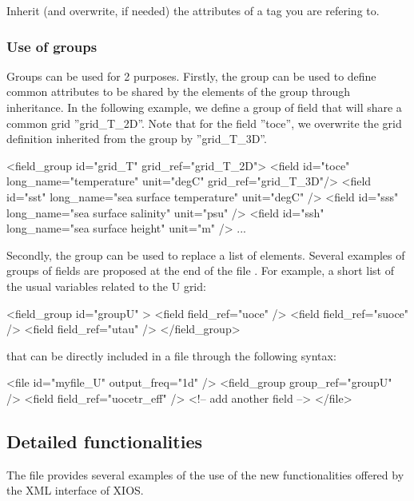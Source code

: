 \documentclass[../main/NEMO_manual]{subfiles}
\begin{document}
Inherit (and overwrite, if needed) the attributes of a tag you are refering to.

\subsubsection{Use of groups}

Groups can be used for 2 purposes.
Firstly, the group can be used to define common attributes to be shared by the elements of
the group through inheritance.
In the following example, we define a group of field that will share a common grid ''grid\_T\_2D''.
Note that for the field ''toce'', we overwrite the grid definition inherited from the group by ''grid\_T\_3D''.

\begin{xmllines}
<field_group id="grid_T" grid_ref="grid_T_2D">
	<field id="toce" long_name="temperature"             unit="degC" grid_ref="grid_T_3D"/>
	<field id="sst"  long_name="sea surface temperature" unit="degC"                     />
	<field id="sss"  long_name="sea surface salinity"    unit="psu"                      />
	<field id="ssh"  long_name="sea surface height"      unit="m"                        />
	...
\end{xmllines}

Secondly, the group can be used to replace a list of elements.
Several examples of groups of fields are proposed at the end of the file .
For example, a short list of the usual variables related to the U grid:

\begin{xmllines}
<field_group id="groupU" >
	<field field_ref="uoce"  />
	<field field_ref="suoce" />
	<field field_ref="utau"  />
</field_group>
\end{xmllines}

that can be directly included in a file through the following syntax:

\begin{xmllines}
<file id="myfile_U" output_freq="1d" />
	<field_group group_ref="groupU" />
	<field field_ref="uocetr_eff"   />  <!-- add another field -->
</file>   
\end{xmllines}

\subsection{Detailed functionalities}

The file  provides several examples of the use of
the new functionalities offered by the XML interface of XIOS.
\end{document}

